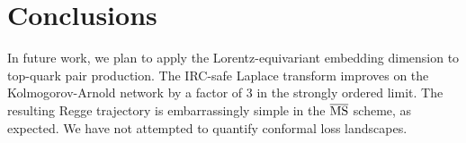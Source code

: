 \section{Conclusions}\label{sec:conclusions}

In future work, we plan to apply the Lorentz-equivariant embedding
dimension to top-quark pair production. The IRC-safe Laplace transform
improves on the Kolmogorov-Arnold network by a factor of 3 in the
strongly ordered limit. The resulting Regge trajectory is embarrassingly
simple in the $\overline{\rm MS}$ scheme, as expected. We have not
attempted to quantify conformal loss landscapes.

